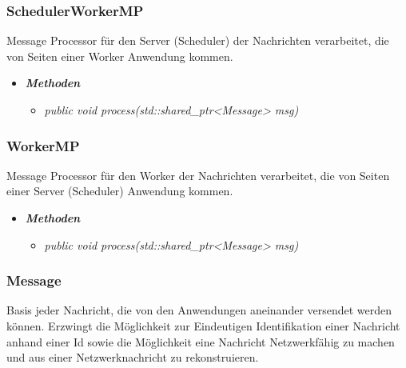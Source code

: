 \documentclass[a4paper,12pt]{article}
\begin{document}
\subsubsection{SchedulerWorkerMP}

Message Processor für den Server (Scheduler) der Nachrichten verarbeitet, die von Seiten einer Worker Anwendung kommen.

	\begin{itemize}[label={}]

	\item\textit{\textbf{Methoden}}
		\begin{itemize}[label={\textbullet}]
			\item\textit{public void process(std::shared\_ptr<Message> msg)}

		\end{itemize}

\end{itemize}


\subsubsection{WorkerMP}

Message Processor für den Worker der Nachrichten verarbeitet, die von Seiten einer Server (Scheduler) Anwendung kommen.

	\begin{itemize}[label={}]

	\item\textit{\textbf{Methoden}}
		\begin{itemize}[label={\textbullet}]
			\item\textit{public void process(std::shared\_ptr<Message> msg)}

		\end{itemize}

\end{itemize}


\subsubsection{Message}

Basis jeder Nachricht, die von den Anwendungen aneinander versendet werden können. Erzwingt die Möglichkeit zur Eindeutigen Identifikation einer Nachricht anhand einer Id sowie die Möglichkeit eine Nachricht Netzwerkfähig zu machen und aus einer Netzwerknachricht zu rekonstruieren.
\end{document}
